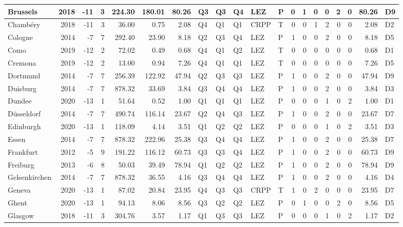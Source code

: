 \begin{tabular}{l|r|r|r|r|r|r|l|l|l|l|l|r|r|r|r|r|r|r|l}
\hline
Brussels & 2018 & -11 & 3 & 224.30 & 180.01 & 80.26 & Q3 & Q3 & Q4 & LEZ & P & 0 & 1 & 0 & 0 & 2 & 0 & 80.26 & D9\\
\hline
Chambéry & 2018 & -11 & 3 & 36.00 & 0.75 & 2.08 & Q4 & Q1 & Q1 & CRPP & T & 0 & 0 & 1 & 2 & 0 & 0 & 2.08 & D2\\
\hline
Cologne & 2014 & -7 & 7 & 292.40 & 23.90 & 8.18 & Q2 & Q3 & Q4 & LEZ & P & 1 & 0 & 0 & 2 & 0 & 0 & 8.18 & D5\\
\hline
Como & 2019 & -12 & 2 & 72.02 & 0.49 & 0.68 & Q4 & Q1 & Q2 & LEZ & T & 0 & 0 & 0 & 0 & 0 & 0 & 0.68 & D1\\
\hline
Cremona & 2019 & -12 & 2 & 13.00 & 0.94 & 7.26 & Q4 & Q1 & Q1 & LEZ & T & 0 & 0 & 0 & 0 & 0 & 0 & 7.26 & D5\\
\hline
Dortmund & 2014 & -7 & 7 & 256.39 & 122.92 & 47.94 & Q2 & Q3 & Q3 & LEZ & P & 1 & 0 & 0 & 2 & 0 & 0 & 47.94 & D9\\
\hline
Duisburg & 2014 & -7 & 7 & 878.32 & 33.69 & 3.84 & Q3 & Q4 & Q4 & LEZ & P & 1 & 0 & 0 & 2 & 0 & 0 & 3.84 & D3\\
\hline
Dundee & 2020 & -13 & 1 & 51.64 & 0.52 & 1.00 & Q1 & Q1 & Q1 & LEZ & P & 0 & 0 & 0 & 1 & 0 & 2 & 1.00 & D1\\
\hline
Düsseldorf & 2014 & -7 & 7 & 490.74 & 116.14 & 23.67 & Q2 & Q4 & Q3 & LEZ & P & 1 & 0 & 0 & 2 & 0 & 0 & 23.67 & D7\\
\hline
Edinburgh & 2020 & -13 & 1 & 118.09 & 4.14 & 3.51 & Q1 & Q2 & Q2 & LEZ & P & 0 & 0 & 0 & 1 & 0 & 2 & 3.51 & D3\\
\hline
Essen & 2014 & -7 & 7 & 878.32 & 222.96 & 25.38 & Q3 & Q4 & Q4 & LEZ & P & 1 & 0 & 0 & 2 & 0 & 0 & 25.38 & D7\\
\hline
Frankfurt & 2012 & -5 & 9 & 191.22 & 116.12 & 60.73 & Q3 & Q3 & Q4 & LEZ & P & 1 & 0 & 0 & 2 & 0 & 0 & 60.73 & D9\\
\hline
Freiburg & 2013 & -6 & 8 & 50.03 & 39.49 & 78.94 & Q1 & Q2 & Q2 & LEZ & P & 1 & 0 & 0 & 2 & 0 & 0 & 78.94 & D9\\
\hline
Gelsenkirchen & 2014 & -7 & 7 & 878.32 & 36.55 & 4.16 & Q3 & Q4 & Q4 & LEZ & P & 1 & 0 & 0 & 2 & 0 & 0 & 4.16 & D4\\
\hline
Geneva & 2020 & -13 & 1 & 87.02 & 20.84 & 23.95 & Q4 & Q3 & Q3 & CRPP & T & 1 & 0 & 2 & 0 & 0 & 0 & 23.95 & D7\\
\hline
Ghent & 2020 & -13 & 1 & 94.13 & 8.06 & 8.56 & Q3 & Q2 & Q2 & LEZ & P & 0 & 1 & 0 & 0 & 2 & 0 & 8.56 & D5\\
\hline
Glasgow & 2018 & -11 & 3 & 304.76 & 3.57 & 1.17 & Q1 & Q3 & Q3 & LEZ & P & 0 & 0 & 0 & 1 & 0 & 2 & 1.17 & D2\\

\end{tabular}
